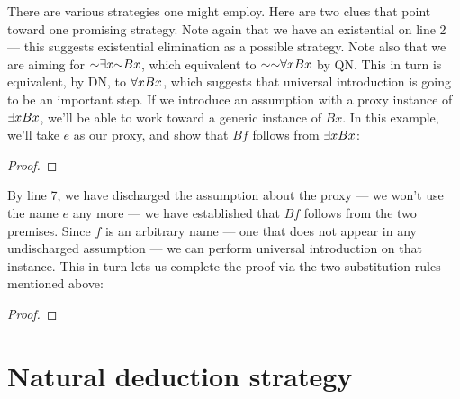 There are various strategies one might employ. Here are two clues that point toward one promising strategy. Note again that we have an existential on line 2 --- this suggests existential elimination as a possible strategy. Note also that we are aiming for $\enot \qt{\exists}{x} \enot Bx$, which equivalent to $\enot \enot \qt{\forall}{x} Bx$ by QN. This in turn is equivalent, by DN, to $\forall x Bx$, which suggests that universal introduction is going to be an important step. If we introduce an assumption with a proxy instance of $\exists x Bx$, we'll be able to work toward a generic instance of $Bx$. In this example, we'll take $e$ as our proxy, and show that $Bf$ follows from $\exists x Bx$:

\begin{proof}
	 \pr{}
	 
	\open
	\close
\end{proof}

By line 7, we have discharged the assumption about the proxy --- we won't use the name $e$ any more --- we have established that $Bf$ follows from the two premises. Since $f$ is an arbitrary name --- one that does not appear in any undischarged assumption --- we can perform universal introduction on that instance. This in turn lets us complete the proof via the two substitution rules mentioned above:

\begin{proof}
	 \pr{}
	 
	\open
	\close
\end{proof}



\section{Natural deduction strategy}

